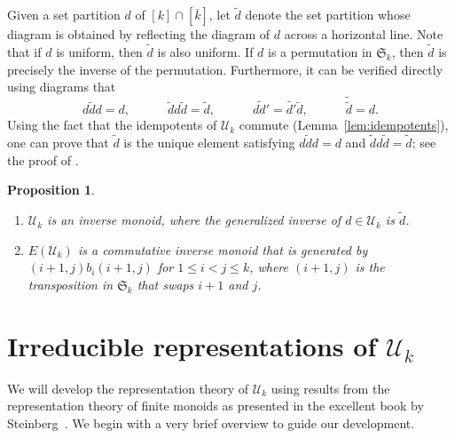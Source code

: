 \documentclass[10pt]{amsart}
\newtheorem{prop}[theorem]{Proposition}
\theoremstyle{definition}
\theoremstyle{remark}
\begin{document}
Given a set partition $d$ of $[k] \cap [\bar{k}]$,
let $\widetilde{d}$ denote the set partition whose diagram is obtained by
reflecting the diagram of $d$ across a horizontal line.
Note that if $d$ is uniform, then $\widetilde{d}$ is also uniform.
If $d$ is a permutation in $\mathfrak{S}_k$,
then $\widetilde{d}$ is precisely the inverse of the permutation.
Furthermore, it can be verified directly using diagrams that
\begin{equation*}
    d\widetilde{d}d = d,
    \qquad\quad
    \widetilde{d}d\widetilde{d} = \widetilde{d},
    \qquad\quad
    \widetilde{dd'} = \widetilde{d'}\widetilde{d},
    \qquad\quad
    \tilde{\tilde{d}} = d.
\end{equation*}
Using the fact that the idempotents of $\mathcal{U}_k$ commute
(Lemma~\ref{lem:idempotents}), one can prove that $\widetilde{d}$ is the unique
element satisfying
$d\widetilde{d}d = d$ and $\widetilde{d}d\widetilde{d} = \widetilde{d}$;
see the proof of \cite[Theorem~3.2]{Steinberg.2016}.
\begin{prop} \leavevmode
    \begin{enumerate}
        \item
            $\mathcal{U}_k$ is an inverse monoid,
            where the generalized inverse of $d \in \mathcal{U}_k$ is $\widetilde{d}$.

        \item
            $E(\mathcal{U}_k)$ is a commutative inverse monoid
            that is generated by
            $(i+1,j) b_i (i+1,j)$ for $1\leqslant i < j \leqslant k$,
            where $(i+1,j)$ is the transposition in $\mathfrak{S}_k$ that swaps $i+1$ and $j$.
    \end{enumerate}
\end{prop}

\section{Irreducible representations of $\mathcal{U}_k$}
\label{section.irreps of Uk}

We will develop the representation theory of $\mathcal{U}_k$
using results from the representation theory of finite monoids
as presented in the excellent book by Steinberg~\cite{Steinberg.2016}.
We begin with a very brief overview to guide our development.
\end{document}
